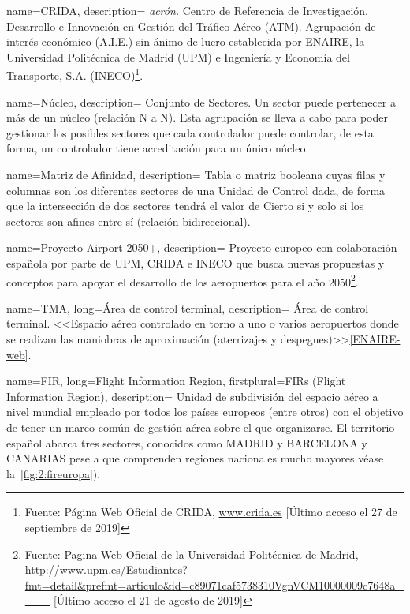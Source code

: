 {
    name={CRIDA},
    description=
    {   
        \textit{acrón.} Centro de Referencia de Investigación, Desarrollo e Innovación 
        en Gestión del Tráfico Aéreo (\gls{ATM}). Agrupación de interés económico (A.I.E.) sin ánimo de lucro 
        establecida por ENAIRE, la Universidad Politécnica de Madrid (UPM) e Ingeniería y Economía del Transporte, S.A. 
        (INECO)\footnote{Fuente: Página Web Oficial de CRIDA, \url{www.crida.es} [Último acceso el 27 de septiembre de 2019]}.
    }
}

{
    name={Núcleo},
    description=
    {   
        Conjunto de Sectores. Un sector puede pertenecer a más de un núcleo (relación N a N). Esta 
        agrupación se lleva a cabo para poder gestionar los posibles sectores que cada controlador puede controlar, de 
        esta 
        forma, un controlador tiene acreditación para un único núcleo.
    }
}

{
    name={Matriz de Afinidad},
    description=
    {   
        Tabla o matriz booleana cuyas filas y columnas son los diferentes sectores de 
        una Unidad de Control dada, de forma que la intersección de dos sectores tendrá el valor de Cierto si y solo si 
        los sectores son afines entre sí (relación bidireccional).
    }
}

{
    name={Proyecto Airport 2050+},
    description=
    {   
        Proyecto europeo con colaboración española por parte de UPM, CRIDA e INECO que busca nuevas propuestas y conceptos para apoyar el desarrollo de los aeropuertos para el año 2050\footnote{Fuente: Pagina Web Oficial de la Universidad Politécnica de Madrid, \url{http://www.upm.es/Estudiantes?fmt=detail&prefmt=articulo&id=c89071caf5738310VgnVCM10000009c7648a____} [Último acceso el 21 de agosto de 2019]}.
    }
}

{
    name={TMA},
    long={Área de control terminal},
    description=
    {   
        Área de control terminal. <<Espacio aéreo controlado en torno a uno o varios aeropuertos 
        donde se realizan las maniobras de aproximación (aterrizajes y despegues)>>\cref{ENAIRE-web}.
    }
}

{
    name={FIR},
    long={Flight Information Region},
    firstplural={FIRs (Flight Information Region)},
    description=
    {   
        Unidad de subdivisión del espacio aéreo a nivel mundial empleado por todos los países europeos (entre otros) con el objetivo de tener un marco común de gestión aérea sobre el que organizarse. El territorio español abarca tres sectores, conocidos como MADRID y BARCELONA y CANARIAS pese a que comprenden regiones nacionales mucho mayores véase la~\autoref{fig:2:fireuropa}).
    }
}



